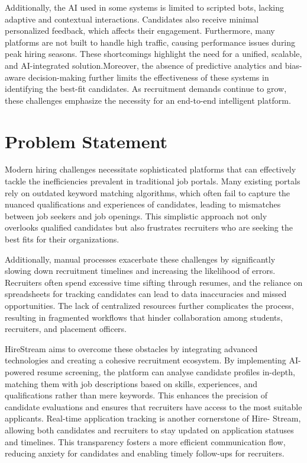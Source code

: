\documentclass[a4paper, 12pt]{report}
\begin{document}
Additionally, the AI used in some systems is limited to scripted bots, lacking adaptive and contextual interactions. Candidates also receive minimal personalized feedback, which affects their engagement. Furthermore, many platforms are not built to handle high traffic, causing performance issues during peak hiring seasons. These shortcomings highlight the need for a unified, scalable, and AI-integrated solution.Moreover, the absence of predictive analytics and bias-aware decision-making further limits the effectiveness of these systems in identifying the best-fit candidates. As recruitment demands continue to grow, these challenges emphasize the necessity for an end-to-end intelligent platform.
 
\pagebreak
\section{Problem Statement}

Modern hiring challenges necessitate sophisticated platforms that can effectively tackle the inefficiencies prevalent in traditional job portals. Many existing portals rely on outdated keyword matching algorithms, which often fail to capture the nuanced qualifications and experiences of candidates, leading to mismatches between job seekers and job openings. This simplistic approach not only overlooks qualified candidates but also frustrates recruiters who are seeking the best fits for their organizations.

Additionally, manual processes exacerbate these challenges by significantly slowing down recruitment timelines and increasing the likelihood of errors. Recruiters often spend excessive time sifting through resumes, and the reliance on spreadsheets for tracking candidates can lead to data inaccuracies and missed opportunities. The lack of centralized resources further complicates the process, resulting in fragmented workflows that hinder collaboration among students, recruiters, and placement officers.

HireStream aims to overcome these obstacles by integrating advanced technologies and creating a cohesive recruitment ecosystem. By implementing AI-powered resume screening, the platform can analyse candidate profiles in-depth, matching them with job descriptions based on skills, experiences, and qualifications rather than mere keywords. This enhances the precision of candidate evaluations and ensures that recruiters have access to the most suitable applicants. Real-time application tracking is another cornerstone of Hire- Stream, allowing both candidates and recruiters to stay updated on application statuses and timelines. This transparency fosters a more efficient communication flow, reducing anxiety for candidates and enabling timely follow-ups for recruiters.
\end{document}

